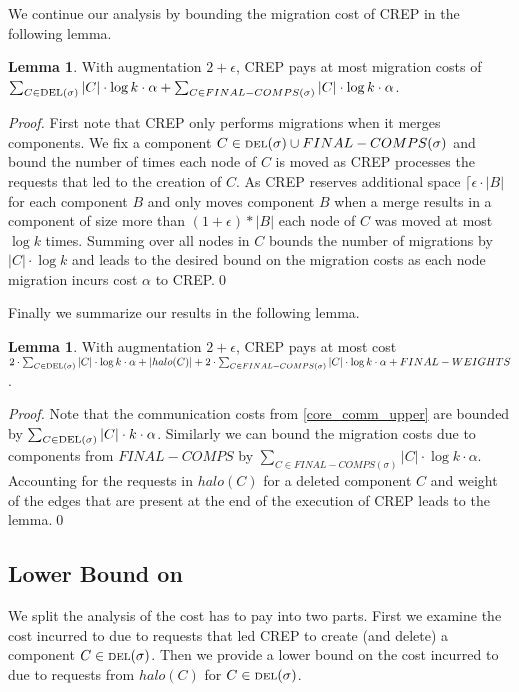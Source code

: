 \documentclass[xcolor=dvipsnames, tikz, 12pt]{article}
\newcommand{\nl}{\newline}
\newcommand{\crep}{C{\scriptsize REP}}
\newcommand{\del}{\text{\scriptsize DEL}}
\newcommand{\opt}{\text{O{\scriptsize PT}}}
\theoremstyle{definition}
\newtheorem{lemma}[defi]{Lemma}
\begin{document}
We continue our analysis by bounding the migration cost of \crep{} in the following lemma.
\begin{lemma}
	With augmentation $2+\epsilon$, \crep{} pays at most migration costs of $\sum_{C\in\del{}(\sigma)}|C|\cdot\log k\cdot\alpha+\sum_{C\in FINAL-COMPS(\sigma)}|C|\cdot\log k\cdot\alpha$.
\end{lemma}

\textit{Proof.} First note that \crep{} only performs migrations when it merges components.
We fix a component $C\in\del{}(\sigma)\cup FINAL-COMPS(\sigma)$ and bound the number of times each node of $C$ is moved as \crep{} processes the requests that led to the creation of $C$. As \crep{} reserves additional space $\lceil\epsilon\cdot|B|$ for each component $B$ and only moves component $B$ when a merge results in a component of size more than $(1+\epsilon)*|B|$ each node of $C$ was moved at most
$\log k$ times. Summing over all nodes in $C$ bounds the number of migrations by $|C|\cdot\log k$ and leads to the desired bound on the migration costs as each node migration incurs cost $\alpha$ to \crep{}.\qed\nl

Finally we summarize our results in the following lemma.
\begin{lemma}
	\label{crep_upper_bound}
	With augmentation $2+\epsilon$, \crep{} pays at most cost $2\cdot\sum_{C\in\del{}(\sigma)}|C|\cdot\log k\cdot\alpha+|halo(C)|+2\cdot\sum_{C\in FINAL-COMPS(\sigma)}|C|\cdot\log k\cdot\alpha+FINAL-WEIGHTS$.
\end{lemma}
\textit{Proof.} Note that the communication costs from \cref{core_comm_upper} are bounded by $\sum_{C\in\del{}(\sigma)}|C|\cdot k\cdot\alpha$. Similarly we can bound the migration costs due to components from $FINAL-COMPS$ by $\sum_{C\in FINAL-COMPS(\sigma)}|C|\cdot\log k\cdot\alpha$. Accounting for the requests in $halo(C)$ for a deleted component $C$ and weight of the edges that are present at the end of the execution of \crep{} leads to the lemma.\qed


\subsection{Lower Bound on \opt{}}
We split the analysis of the cost \opt{} has to pay into two parts. First we examine the cost incurred to \opt{} due to requests that led \crep{} to create (and delete) a component $C\in\del{}(\sigma)$. Then we provide a lower bound on the cost incurred to \opt{} due to requests from $halo(C)$ for $C\in\del{}(\sigma)$.
\end{document}
